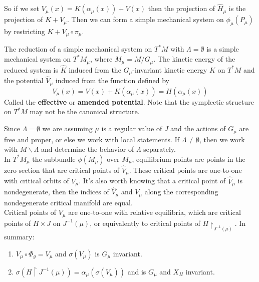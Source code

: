 \indent So if we set $V_{\mu}(x) = K(\alpha_{\mu}(x)) + V(x)$ then the projection of $\widehat{H}_{\mu}$ is the projection of $K+V_{\mu}$. Then we can form a simple mechanical system on $\phi_{\mu}(P_{\mu})$ by restricting $K+V_{\mu} \circ \pi_{\mu}$.

\begin{thm}
The reduction of a simple mechanical system on $T^*M$ with $\Lambda = \emptyset$ is a simple mechanical system on $T^*M_{\mu}$, where $M_{\mu} = M / G_{\mu}$. The kinetic energy of the reduced system is $\widehat{K}$ induced from the $G_{\mu}$-invariant kinetic energy $K$ on $T^*M$ and the potential $\widehat{V}_{\mu}$ induced from the function defined by 
\begin{equation}
    V_{\mu}(x) = V(x) + K(\alpha_{\mu}(x)) = H(\alpha_{\mu}(x))
\end{equation}
Called the \textbf{effective} or \textbf{amended potential}. Note that the symplectic structure on $T^*M$ may not be the canonical structure.
\end{thm}

Since $\Lambda = \emptyset$ we are assuming $\mu$ is a regular value of $J$ and the actions of $G_{\mu}$ are free and proper, or else we work with local statements. If $\Lambda \neq \emptyset$, then we work with $M \backslash \Lambda$ and determine the behavior of $\Lambda$ separately. \\
\indent In $T^*M_{\mu}$ the subbundle $\phi(M_{\mu})$ over $M_{\mu}$, equilibrium points are points in the zero section that are critical points of $\widehat{V}_{\mu}$. These critical points are one-to-one with critical orbits of $V_{\mu}$. It's also worth knowing that a critical point of $\widehat{V}_{\mu}$ is nondegenerate, then the indices of $\widehat{V}_{\mu}$ and $V_{\mu}$ along the corresponding nondegenerate critical manifold are equal. \\
\indent Critical points of $V_{\mu}$ are one-to-one with relative equilibria, which are critical points of $H \times J$ on $J^{-1}(\mu)$, or equivalently to critical points of $H \restriction_{J^{-1}(\mu)}$. In summary:

\begin{cor}\label{cor:1}
\begin{enumerate}
    \item $V_{\mu} \circ \Phi_g = V_{\mu}$ and $\sigma(V_{\mu})$ is $G_{\mu}$ invariant.
    \item $\sigma (H \restriction{J^{-1}(\mu)}) = \alpha_{\mu}(\sigma(V_{\mu}))$ and is $G_{\mu}$ and $X_H$ invariant.
\end{enumerate}
\end{cor}

